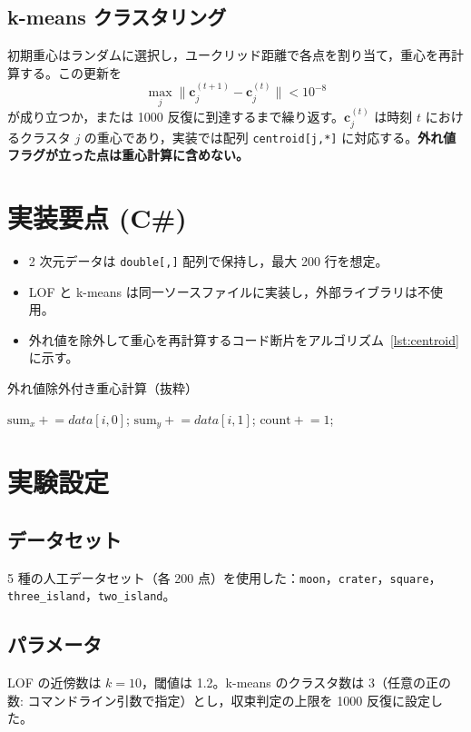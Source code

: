 \documentclass[a4j,dvipdfmx]{jsarticle}
\begin{document}
\subsection{k-means クラスタリング}
初期重心はランダムに選択し，ユークリッド距離で各点を割り当て，重心を再計算する。この更新を
\[
  \max_{j} \bigl\| \mathbf{c}_{j}^{(t+1)}-\mathbf{c}_{j}^{(t)} \bigr\| < 10^{-8}
\]
が成り立つか，または 1000 反復に到達するまで繰り返す。$\mathbf{c}_{j}^{(t)}$ は時刻 $t$ におけるクラスタ $j$ の重心であり，実装では配列 \texttt{centroid[j,*]} に対応する。\textbf{外れ値フラグが立った点は重心計算に含めない。}

\section{実装要点 (C\#)}
\begin{itemize}
  \item 2 次元データは \texttt{double[,]} 配列で保持し，最大 200 行を想定。
  \item LOF と k-means は同一ソースファイルに実装し，外部ライブラリは不使用。
  \item 外れ値を除外して重心を再計算するコード断片をアルゴリズム~\ref{lst:centroid} に示す。
\end{itemize}

\begin{algorithm}[tbp]
\caption{外れ値除外付き重心計算（抜粋）}
\label{lst:centroid}
\begin{algorithmic}[1]
    \STATE $\text{sum}_x \mathrel{+}= data[i,0]$;
    \STATE $\text{sum}_y \mathrel{+}= data[i,1]$;
    \STATE $\text{count} \mathrel{+}=1$;
  \ENDIF
\ENDFOR
\end{algorithmic}
\end{algorithm}

\section{実験設定}
\subsection{データセット}
5 種の人工データセット（各 200 点）を使用した：\texttt{moon}，\texttt{crater}，\texttt{square}，\texttt{three\_island}，\texttt{two\_island}。

\subsection{パラメータ}
LOF の近傍数は $k=10$，閾値は 1.2。k-means のクラスタ数は 3（任意の正の数: コマンドライン引数で指定）とし，収束判定の上限を 1000 反復に設定した。
\end{document}
